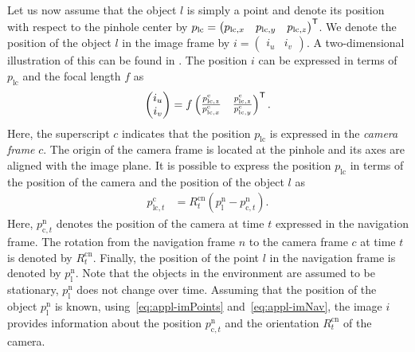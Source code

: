 Let us now assume that the object $l$ is simply a point and denote its position with respect to the pinhole center by $p_{\text{lc}} = \begin{pmatrix} p_{\text{lc},x} & p_{\text{lc},y} & p_{\text{lc},z} \end{pmatrix}^{\mathsf{T}}$. We denote the position of the object $l$ in the image frame by $i = \begin{pmatrix} i_u & i_v \end{pmatrix}$. A two-dimensional illustration of this can be found in . The position $i$ can be expressed in terms of $p_{\text{lc}}$ and the focal length $f$ as
\begin{align}
\label{eq:appl-imPoints}
\begin{pmatrix} i_{u} \\ i_{v} \end{pmatrix} = f
\begin{pmatrix} \tfrac{p_{\text{lc},z}^\text{c}}{p_{\text{lc},x}^\text{c}} & \tfrac{p_{\text{lc},z}^\text{c}}{p_{\text{lc},y}^\text{c}} \end{pmatrix}^{\mathsf{T}}.
\end{align}
Here, the superscript $c$ indicates that the position $p_{\text{lc}}$ is expressed in the \emph{camera frame} $c$. The origin of the camera frame is located at the pinhole and its axes are aligned with the image plane. It is possible to express the position $p_{\text{lc}}$ in terms of the position of the camera and the position of the object $l$ as
\begin{align}
\label{eq:appl-imNav}
p_{\text{lc},t}^\text{c} &= R^\text{cn}_t \left( p^\text{n}_\text{l} - p^\text{n}_{\text{c},t} \right).
\end{align}
Here, $p^\text{n}_{\text{c},t}$ denotes the position of the camera at time $t$ expressed in the navigation frame. The rotation from the navigation frame $n$ to the camera frame $c$ at time $t$ is denoted by $R^\text{cn}_t$. Finally, the position of the point $l$ in the navigation frame is denoted by $p^\text{n}_\text{l}$. Note that the objects in the environment are assumed to be stationary, \ie $p^\text{n}_\text{l}$ does not change over time. Assuming that the position of the object $p^\text{n}_\text{l}$ is known, using~\eqref{eq:appl-imPoints} and~\eqref{eq:appl-imNav}, the image $i$ provides information about the position $p^\text{n}_{\text{c},t}$ and the orientation $R^\text{cn}_t$ of the camera.

